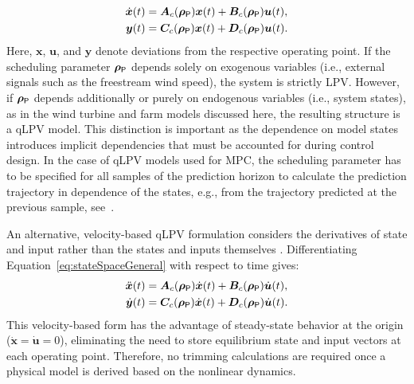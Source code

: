 \begin{equation} \label{eq:standardqLPV1}
    \begin{aligned}
        \dot{\bm{x}}(t) &= \bm{A}_c(\bm{\rho}_{\mathsf{P}}) \bm{x}(t) + \bm{B}_c(\bm{\rho}_{\mathsf{P}}) \bm{u}(t), \\
        \bm{y}(t) &= \bm{C}_c(\bm{\rho}_{\mathsf{P}}) \bm{x}(t) + \bm{D}_c(\bm{\rho}_{\mathsf{P}}) \bm{u}(t). 
    \end{aligned}
\end{equation}
Here, $\bm{x}$, $\bm{u}$, and $\bm{y}$ denote deviations from the respective operating point. If the scheduling parameter $\bm{\rho}_{\mathsf{P}}$ depends solely on exogenous variables (i.e., external signals such as the freestream wind speed), the system is strictly LPV. However, if $\bm{\rho}_{\mathsf{P}}$ depends additionally or purely on endogenous variables (i.e., system states), as in the wind turbine and farm models discussed here, the resulting structure is a qLPV model. This distinction is important as the dependence on model states introduces implicit dependencies that must be accounted for during control design. In the case of qLPV models used for MPC, the scheduling parameter has to be specified for all samples of the prediction horizon to calculate the prediction trajectory in dependence of the states, e.g., from the trajectory predicted at the previous sample, see~\cite{cisneros2016efficient}.

An alternative, velocity-based qLPV formulation considers the derivatives of state and input rather than the states and inputs themselves \cite{cisneros2020velocity}. Differentiating Equation~\eqref{eq:stateSpaceGeneral} with respect to time gives:
\begin{align*}
    \ddot{\bm{x}}(t) &= \bm{A}_c(\bm{\rho}_{\mathsf{P}}) \dot{\bm{x}}(t) +\bm{B}_c(\bm{\rho}_{\mathsf{P}}) \dot{\bm{u}}(t), \\
    \dot{\bm{y}}(t) &= \bm{C}_c(\bm{\rho}_{\mathsf{P}})  \dot{\bm{x}}(t) + \bm{D}_c(\bm{\rho}_{\mathsf{P}}) \dot{\bm{u}}(t).
\end{align*}
This velocity-based form has the advantage of steady-state behavior at the origin ($\dot{\bm{x}}=\dot{\bm{u}}=0$), eliminating the need to store equilibrium state and input vectors at each operating point. Therefore, no trimming calculations are required once a physical model is derived based on the nonlinear dynamics. 

